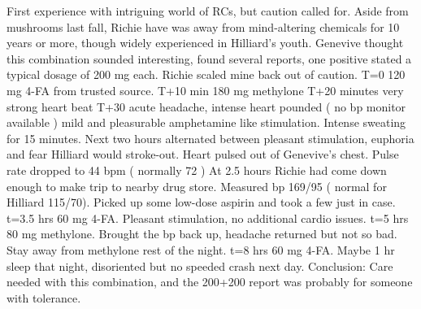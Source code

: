 \documentclass[12pt]{book}
\begin{document}
First experience with intriguing world of RCs, but caution called for. Aside from mushrooms last fall, Richie have was away from mind-altering chemicals for 10 years or more, though widely experienced in Hilliard's youth. Genevive thought this combination sounded interesting, found several reports, one positive stated a typical dosage of 200 mg each. Richie scaled mine back out of caution. T=0 120 mg 4-FA from trusted source. T+10 min 180 mg methylone T+20 minutes very strong heart beat T+30 acute headache, intense heart pounded ( no bp monitor available ) mild and pleasurable amphetamine like stimulation. Intense sweating for 15 minutes. Next two hours alternated between pleasant stimulation, euphoria and fear Hilliard would stroke-out. Heart pulsed out of Genevive's chest. Pulse rate dropped to 44 bpm ( normally 72 ) At 2.5 hours Richie had come down enough to make trip to nearby drug store. Measured bp 169/95 ( normal for Hilliard 115/70). Picked up some low-dose aspirin and took a few just in case. t=3.5 hrs 60 mg 4-FA. Pleasant stimulation, no additional cardio issues. t=5 hrs 80 mg methylone. Brought the bp back up, headache returned but not so bad. Stay away from methylone rest of the night. t=8 hrs 60 mg 4-FA. Maybe 1 hr sleep that night, disoriented but no speeded crash next day. Conclusion: Care needed with this combination, and the 200+200 report was probably for someone with tolerance.
\end{document}
